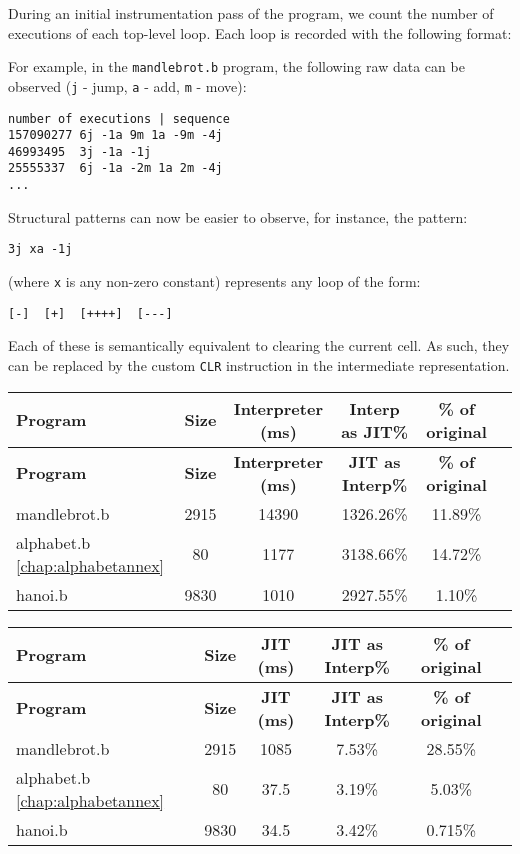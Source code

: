 \par During an initial instrumentation pass of the program, we count the number of executions of each top-level loop. Each loop is recorded with the following format:

\par For example, in the \texttt{mandlebrot.b} program, the following raw data can be observed (\texttt{j} - jump, \texttt{a} - add, \texttt{m} - move):

\begin{verbatim}
number of executions | sequence
157090277 6j -1a 9m 1a -9m -4j
46993495  3j -1a -1j
25555337  6j -1a -2m 1a 2m -4j
...
\end{verbatim}

\par Structural patterns can now be easier to observe, for instance, the pattern:

\begin{verbatim}
3j xa -1j
\end{verbatim}

\par (where \texttt{x} is any non-zero constant) represents any loop of the form:

\begin{verbatim}
[-]  [+]  [++++]  [---]
\end{verbatim}

\par Each of these is semantically equivalent to clearing the current cell. As such, they can be replaced by the custom \texttt{CLR} instruction in the intermediate representation.

\begin{longtable}{|l|c|c|c|c|c|}
\hline
\textbf{Program} & \textbf{Size} & \textbf{Interpreter (ms)} & \textbf{Interp as JIT\%} & \textbf{\% of original} \\
\hline
\endfirsthead
\hline
\textbf{Program} & \textbf{Size} & \textbf{Interpreter (ms)} & \textbf{JIT as Interp\%} & \textbf{\% of original} \\
\hline
\endhead
\hline
\endfoot
mandlebrot.b & 2915  & 14390 & 1326.26\% & 11.89\% \\
alphabet.b \ref{chap:alphabetannex}   & 80    & 1177  & 3138.66\% & 14.72\% \\
hanoi.b      & 9830  & 1010  & 2927.55\% & 1.10\% \\
\hline
\end{longtable}

\begin{longtable}{|l|c|c|c|c|c|}
\hline
\textbf{Program} & \textbf{Size} & \textbf{JIT (ms)} & \textbf{JIT as Interp\%} & \textbf{\% of original} \\
\hline
\endfirsthead
\hline
\textbf{Program} & \textbf{Size} & \textbf{JIT (ms)} & \textbf{JIT as Interp\%} & \textbf{\% of original} \\
\hline
\endhead
\hline
\endfoot
mandlebrot.b & 2915  & 1085   & 7.53\%  & 28.55\% \\
alphabet.b \ref{chap:alphabetannex}   & 80    & 37.5   & 3.19\%  & 5.03\% \\
hanoi.b      & 9830  & 34.5   & 3.42\%  & 0.715\% \\
\hline
\end{longtable}

